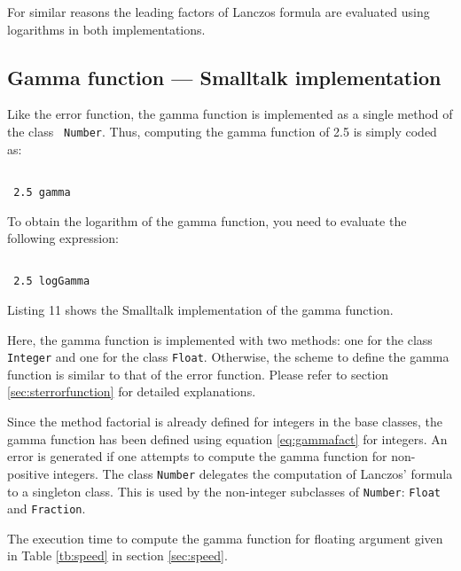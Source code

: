 \documentclass[twoside]{book}
\begin{document}
For similar reasons the leading factors of Lanczos formula are
evaluated using logarithms in both implementations.

\subsection{Gamma function --- Smalltalk implementation}
 Like the error function, the gamma
function is implemented as a single method of the class {\tt
Number}. Thus, computing the gamma function of 2.5 is simply coded
as:
\begin{codeExample}
\begin{verbatim}

 2.5 gamma
\end{verbatim}
\end{codeExample}
To obtain the logarithm of the gamma function, you need to
evaluate the following expression:
\begin{codeExample}
\begin{verbatim}

 2.5 logGamma
\end{verbatim}
\end{codeExample}
Listing 11 shows the Smalltalk implementation of the gamma
function.

Here, the gamma function is implemented with two methods: one for
the class {\tt Integer} and one for the class {\tt Float}.
Otherwise, the scheme to define the gamma function is similar to
that of the error function. Please refer to section
\ref{sec:sterrorfunction} for detailed explanations.

Since the method factorial is already defined for integers in the
base classes, the gamma function has been defined using equation
\ref{eq:gammafact} for integers. An error is generated if one
attempts to compute the gamma function for non-positive integers.
The class {\tt Number} delegates the computation of Lanczos'
formula to a singleton class. This is used by the non-integer
subclasses of {\tt Number}: {\tt Float} and {\tt Fraction}.

The execution time to compute the gamma function for floating
argument given in Table \ref{tb:speed} in section \ref{sec:speed}.
\begin{listing}
\label{ls:gammafunc}



\end{listing}
\end{document}
